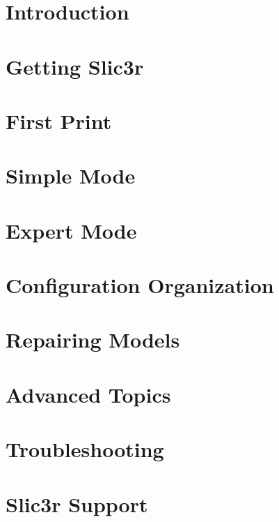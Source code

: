 \section{Introduction}


\section{Getting Slic3r}


\section{First Print}


\section{Simple Mode}


\section{Expert Mode}


\section{Configuration Organization}


\section{Repairing Models}


\section{Advanced Topics}


\section{Troubleshooting}


\section{Slic3r Support}

